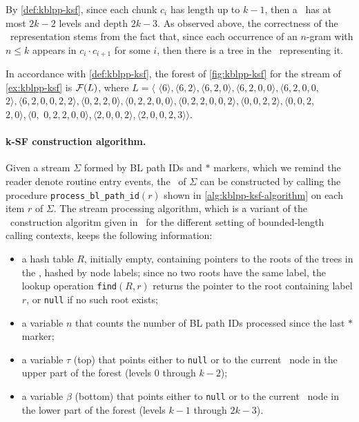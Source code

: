 \noindent By \mydefinition\ref{def:kblpp-ksf}, since each chunk $c_i$ has length up to $k-1$, then a \ksf\ has at most $2k-2$ levels and depth $2k-3$. As observed above, the correctness of the \ksf\ representation stems from the fact that, since each occurrence of an $n$-gram with $n\le k$ appears in $c_i\cdot c_{i+1}$ for some $i$, then there is a tree in the \ksf\ representing it.

\begin{example} In accordance with \mydefinition\ref{def:kblpp-ksf}, the forest of \myfigure\ref{fig:kblpp-ksf} for the stream of \myexample\ref{ex:kblpp-ksf} is ${\cal F}(L)$, where $L=\langle$ $
\langle 6\rangle, 
\langle 6, 2\rangle, 
\langle 6, 2, 0\rangle, 
\langle 6, 2, 0, 0\rangle, 
\langle 6, 2, 0, 0,$
$
2\rangle,
\langle 6, 2, 0, 0, 2, 2\rangle,
\langle 0, 2, 2, 0\rangle, 
\langle 0, 2, 2, 0, 0\rangle, 
\langle 0, 2, 2, 0, 0, 2\rangle,
\langle 0, 0, 2, 2\rangle,
\langle 0, 0,2,$ $2, 0\rangle,
\langle 0,$
$
0, 2, 2, 0, 0\rangle,
\langle 2, 0, 0, 2\rangle,
\langle 2, 0, 0, 2, 3\rangle
\rangle$.
\end{example}

\paragraph*{k-SF construction algorithm.} Given a stream $\Sigma$ formed by BL path IDs and $*$ markers, which we remind the reader denote routine entry events, the \ksf\ of $\Sigma$ can be constructed by calling the procedure {\tt process\_bl\_path\_id}$(r)$ shown in \myalgorithm\ref{alg:kblpp-ksf-algorithm} on each item $r$ of $\Sigma$. The stream processing algorithm, which is a variant of the \ksf\ construction algoritm given in~\cite{Ausiello12} for the different setting of bounded-length calling contexts, keeps the following information:

\begin{itemize}[parsep=0pt]
\item a hash table $R$, initially empty, containing pointers to the roots of the trees in the \ksf, hashed by node labels; since no two roots have the same label, the lookup operation {\tt find}$(R, r)$ returns the pointer to the root containing label $r$, or {\tt null} if no such root exists;
\item a variable $n$ that counts the number of BL path IDs processed since the last $*$ marker;
\item a variable $\tau$ (top) that points either to {\tt null} or to the current \ksf\ node in the upper part of the forest (levels 0 through $k-2$);
\item a variable $\beta$ (bottom) that points either to {\tt null} or to the current \ksf\ node in the lower part of the forest (levels $k-1$ through $2k-3$).
\end{itemize}

